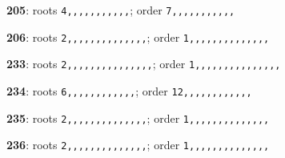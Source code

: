 \noindent \textbf{205}: roots \texttt{4,,,,,,,,,,,}; order \texttt{7,,,,,,,,,,,}\par
\noindent \textbf{206}: roots \texttt{2,,,,,,,,,,,,,,}; order \texttt{1,,,,,,,,,,,,,,}\par
\noindent \textbf{233}: roots \texttt{2,,,,,,,,,,,,,,,}; order \texttt{1,,,,,,,,,,,,,,,}\par
\noindent \textbf{234}: roots \texttt{6,,,,,,,,,,,,}; order \texttt{12,,,,,,,,,,,,}\par
\noindent \textbf{235}: roots \texttt{2,,,,,,,,,,,,,,}; order \texttt{1,,,,,,,,,,,,,,}\par
\noindent \textbf{236}: roots \texttt{2,,,,,,,,,,,,,,}; order \texttt{1,,,,,,,,,,,,,,}\par
